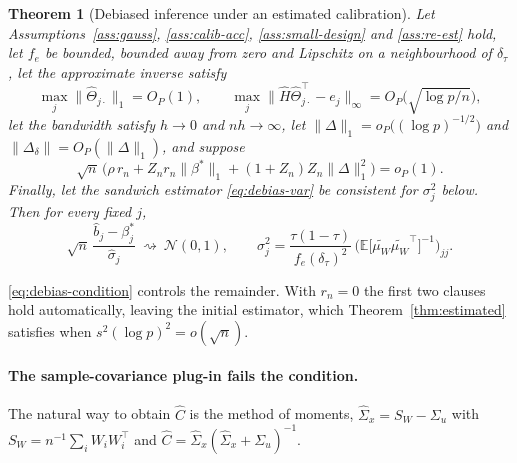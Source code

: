 \documentclass[12pt,a4paper]{article}
\newtheorem{theorem}{Theorem}[section]
\theoremstyle{definition}
\theoremstyle{remark}
\newcommand{\E}{\mathbb{E}}
\newcommand{\cN}{\mathcal{N}}
\newcommand{\betas}{\beta^*}
\newcommand{\muv}{\mu_W}
\newcommand{\Ccal}{C}
\begin{document}
\begin{theorem}[Debiased inference under an estimated calibration]
\label{thm:debias-clt}
Let Assumptions~\ref{ass:gauss}, \ref{ass:calib-acc}, \ref{ass:small-design} and
\ref{ass:re-est} hold, let $f_e$ be bounded, bounded away from zero and Lipschitz on a
neighbourhood of $\delta_\tau$, let the approximate inverse satisfy
\begin{equation}
\max_j\|\hat\Theta_{j\cdot}\|_1=O_P(1),
\qquad
\max_j\big\|\hat H\hat\Theta_{j\cdot}^{\top}-e_j\big\|_\infty=O_P\big(\sqrt{\log p/n}\big),
\label{eq:nodewise}
\end{equation}
let the bandwidth satisfy $h\to0$ and $nh\to\infty$, let
$\|\Delta\|_1=o_P\big((\log p)^{-1/2}\big)$ and $\|\Delta_\delta\|=O_P(\|\Delta\|_1)$, and
suppose
\begin{equation}
\sqrt n\,\Big(\rho\,r_n+Z_nr_n\|\betas\|_1+(1+Z_n)Z_n\|\Delta\|_1^2\Big)=o_P(1).
\label{eq:debias-condition}
\end{equation}
Finally, let the sandwich estimator \eqref{eq:debias-var} be consistent for
$\sigma_j^2$ below. Then for every fixed $j$,
\begin{equation}
\sqrt n\,\frac{\hat b_j-\beta^*_j}{\hat\sigma_j}
\ \rightsquigarrow\ \cN(0,1),
\qquad
\sigma_j^2=\frac{\tau(1-\tau)}{f_e(\delta_\tau)^{2}}\,
\Big(\E\big[\tilde{\muv}{\tilde{\muv}}^\top\big]^{-1}\Big)_{jj}.
\label{eq:debias-clt}
\end{equation}
\end{theorem}

\eqref{eq:debias-condition} controls the remainder.
With $r_n=0$ the first two clauses hold automatically, leaving the initial estimator, which
Theorem~\ref{thm:estimated} satisfies when $s^2(\log p)^{2}=o(\sqrt n)$.

\paragraph{The sample-covariance plug-in fails the condition.}
The natural way to obtain $\hat\Ccal$ is the method of moments,
$\hat\Sigma_x=S_W-\Sigma_u$ with $S_W=n^{-1}\sum_iW_iW_i^\top$ and
$\hat\Ccal=\hat\Sigma_x(\hat\Sigma_x+\Sigma_u)^{-1}$.
\end{document}
